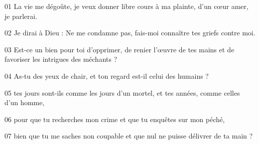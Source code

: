 01 La vie me dégoûte, je veux donner libre cours à ma plainte, d’un cœur amer, je parlerai.

02 Je dirai à Dieu : Ne me condamne pas, fais-moi connaître tes griefs contre moi.

03 Est-ce un bien pour toi d’opprimer, de renier l’œuvre de tes mains et de favoriser les intrigues des méchants ?

04 As-tu des yeux de chair, et ton regard est-il celui des humains ?

05 tes jours sont-ils comme les jours d’un mortel, et tes années, comme celles d’un homme,

06 pour que tu recherches mon crime et que tu enquêtes sur mon péché,

07 bien que tu me saches non coupable et que nul ne puisse délivrer de ta main ?